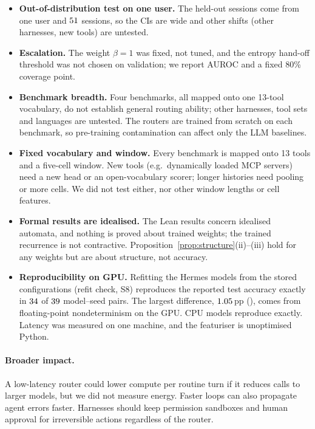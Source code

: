 \documentclass[10pt,twocolumn,letterpaper]{article}
\begin{document}
\begin{itemize}[leftmargin=1.2em, itemsep=0.1em]
  \item \textbf{Out-of-distribution test on one user.} The held-out sessions come from one user and $51$ sessions, so the CIs are wide and other shifts (other harnesses, new tools) are untested.
  \item \textbf{Escalation.} The weight $\beta{=}1$ was fixed, not tuned, and the entropy hand-off threshold was not chosen on validation; we report AUROC and a fixed 80\% coverage point.
  \item \textbf{Benchmark breadth.} Four benchmarks, all mapped onto one 13-tool vocabulary, do not establish general routing ability; other harnesses, tool sets and languages are untested. The routers are trained from scratch on each benchmark, so pre-training contamination can affect only the LLM baselines.
  \item \textbf{Fixed vocabulary and window.} Every benchmark is mapped onto 13 tools and a five-cell window. New tools (e.g.\ dynamically loaded MCP servers) need a new head or an open-vocabulary scorer; longer histories need pooling or more cells. We did not test either, nor other window lengths or cell features.
  \item \textbf{Formal results are idealised.} The Lean results concern idealised automata, and nothing is proved about trained weights; the trained recurrence is not contractive. Proposition~\ref{prop:structure}(ii)--(iii) hold for any weights but are about structure, not accuracy.
  \item \textbf{Reproducibility on GPU.} Refitting the Hermes models from the stored configurations (refit check, S8) reproduces the reported test accuracy exactly in $34$ of $39$ model--seed pairs. The largest difference, $1.05$\,pp (\numRRefitMaxModel{}), comes from floating-point nondeterminism on the GPU. CPU models reproduce exactly. Latency was measured on one machine, and the featuriser is unoptimised Python.
\end{itemize}
\paragraph{Broader impact.} A low-latency router could lower compute per routine turn if it reduces calls to larger models, but we did not measure energy. Faster loops can also propagate agent errors faster. Harnesses should keep permission sandboxes and human approval for irreversible actions regardless of the router.
\end{document}
